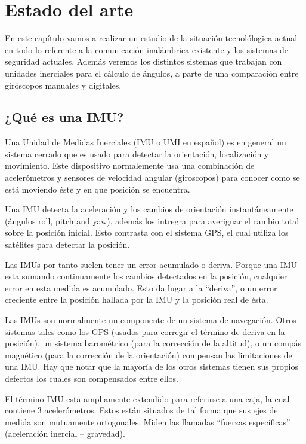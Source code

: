 	\chapter{Estado del arte}\label{cap.estadoDelArte}
	
	En este capítulo vamos a realizar un estudio de la situación tecnolólogica actual en todo lo referente a la comunicación inalámbrica existente y los sistemas de seguridad actuales. Además veremos los distintos sistemas que trabajan con unidades inerciales para el cálculo de ángulos, a parte de una comparación entre giróscopos manuales y digitales.
	
	\section{¿Qué es una IMU?}
	
		Una Unidad de Medidas Inerciales (IMU o UMI en español) es en general un sistema cerrado que es usado para detectar la orientación, localización y movimiento. Este dispositivo normalemente usa una combinación de acelerómetros y sensores de velocidad angular (giroscopos) para conocer como se está moviendo éste y en que posición se encuentra.
		
		Una IMU detecta la aceleración y los cambios de orientación instantáneamente (ángulos roll, pitch and yaw), además los intregra para averiguar el cambio total sobre la posición inicial. Esto contrasta con el sistema GPS, el cual utiliza los satélites para detectar la posición.
		
		Las IMUs por tanto suelen tener un error acumulado o deriva. Porque una IMU esta sumando continuamente los cambios detectados en la posición, cualquier error en esta medida es acumulado. Esto da lugar a la “deriva”, o un error creciente entre la posición hallada por la IMU y la posición real de ésta.
		
		Las IMUs son normalmente un componente de un sistema de navegación. Otros sistemas tales como los GPS (usados para corregir el término de deriva en la posición), un sistema barométrico (para la corrección de la altitud), o un compás magnético (para la corrección de la orientación) compensan las limitaciones de una IMU. Hay que notar que la mayoría de los otros sistemas tienen sus propios defectos los cuales son compensados entre ellos.
		
		El término IMU esta ampliamente extendido para referirse a una caja, la cual contiene 3 acelerómetros. Estos están situados de tal forma que sus ejes de medida son mutuamente ortogonales. Miden las llamadas “fuerzas específicas” (aceleración inercial – gravedad). 
		
